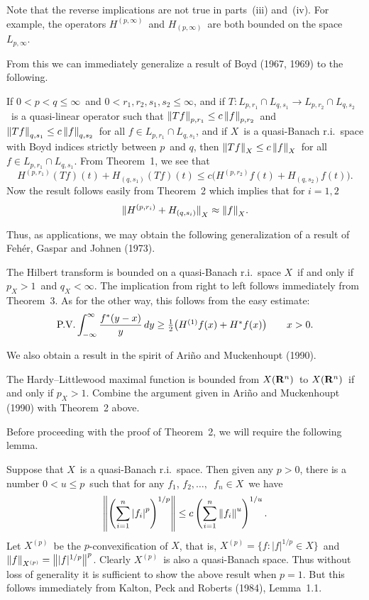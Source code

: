 Note that the reverse implications are not true in parts~(iii) and~(iv).
For example, the operators $H^{(p,\infty)}$\ and $H_{(p,\infty)}$\ are
both bounded on the space $L_{p,\infty}$.

From this we can immediately generalize a result of Boyd (1967, 1969) 
to the following.

If $0 < p < q \le \infty$\ and $0 < r_1,r_2,s_1,s_2 
\le \infty$, 
and if $T:L_{p,r_1} \cap L_{q,s_1}
\to L_{p,r_2} \cap L_{q,s_2}$\ is a quasi-linear operator 
such that ${\left\| Tf \right\|}_{p,r_1} \le c\, {\left\| f \right\|}_{p,r_2}$\ and
${\left\| Tf \right\|}_{q,s_1} \le c\, {\left\| f \right\|}_{q,s_2}$\ for all 
$f\in L_{p,r_1} \cap L_{q,s_1}$, and
if $X$\ is a quasi-Banach r.i.\ space with 
Boyd indices strictly between $p$\ and $q$, then
${\left\| Tf \right\|}_X \le c\, {\left\| f \right\|}_X$\ for all $f\in L_{p,r_1} \cap L_{q,s_1}$.
\endproclaim
\proof
From Theorem~1, we see that
$$ H^{(p,r_1)}(Tf)(t) + H_{(q,s_1)}(Tf)(t) \le c 
   \bigl(H^{(p,r_2)}f(t) + H_{(q,s_2)}f(t)\bigr) .$$
Now the result
follows easily from Theorem~2 which implies that for $i=1,2$\ 
$$ {\mathopen\| H^{(p,r_i)} + H_{(q,s_i)} \mathclose\|}_X \approx {\mathopen\| f \mathclose\|}_X .$$
\endproof

Thus, as applications, we may obtain the following generalization of 
a result of Feh\'er, Gaspar and Johnen (1973).

The Hilbert transform is bounded on a quasi-Banach 
r.i.\ space $X$\ if and only if $p_X>1$\ and $q_X<\infty$.
\endproclaim
\proof
The implication from right to left follows immediately from Theorem~3.
As for the other way, this follows from the easy estimate:
$$ \hbox{\rm P.V.} \int_{-\infty}^\infty
   {f^*(y-x) \over y} \, dy \ge \textstyle{1\over 2}
   \bigl(H^{(1)}f(x) + H^*f(x)\bigr)  \qquad x > 0.$$
\endproof

We also obtain a result in the spirit of  
Ari\~no and Muckenhoupt (1990).  

  The Hardy--Littlewood maximal function is
bounded from $X({\bf R}^n)$\ to $X({\bf R}^n)$\ if and only if
$p_X>1$.
\endproclaim
\proof
Combine the argument given in Ari\~no and Muckenhoupt (1990) with Theorem~2 above.
\endproof

Before proceeding with the proof of Theorem~2, we will require the following
lemma.

Suppose that $X$\ is a quasi-Banach r.i.\ space.
Then given any $p>0$, there is a number $0<u\le p$\ such that
for any $f_1$, $f_2,\dots,$\ $f_n \in X$\ we have
$$ {\left\| \left(\sum_{i=1}^n {\left| f_i \right|}^p\right)^{1/p} \right\|}
   \le c \left(\sum_{i=1}^n {\left\| f_i \right\|}^u\right)^{1/u} .$$
\endproclaim
\proof  Let $X^{(p)}$\ be the $p$-convexification of $X$, that is,
$ X^{(p)} = \{f: |f|^{1/p} \in X\}$\ and ${\left\| f \right\|}_{X^{(p)}} = {\left\| 
|f|^{1/p} \right\|}^p$.  Clearly $X^{(p)}$\ is also a quasi-Banach space.  Thus
without loss of generality it is sufficient to show the above result
when $p = 1$.  But this follows immediately from 
Kalton, Peck and Roberts (1984), Lemma~1.1.
\endproof

